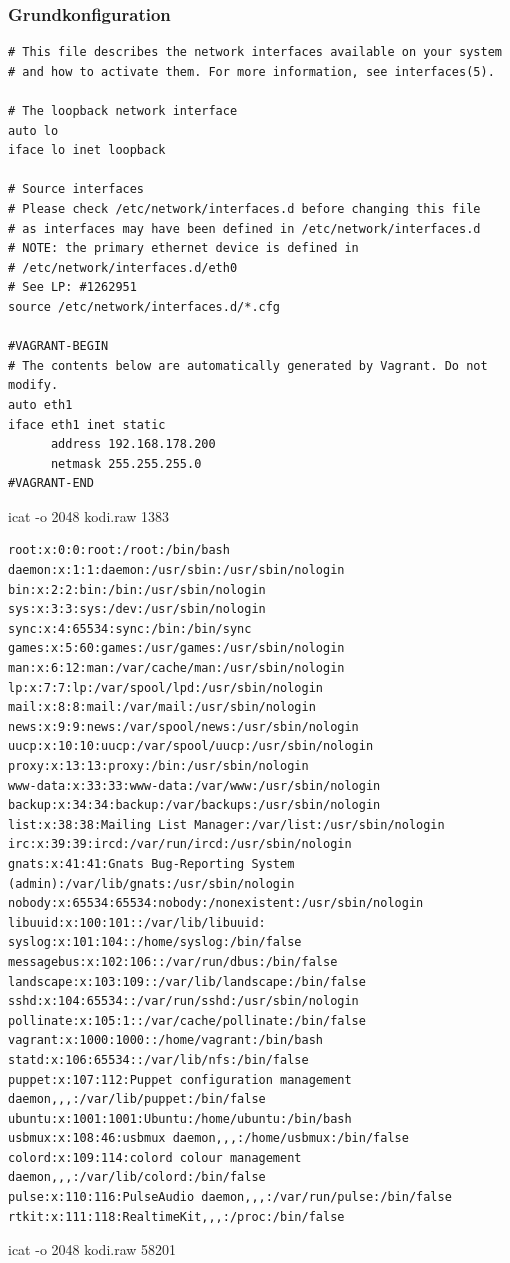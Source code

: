 \subsubsection{Grundkonfiguration}

\begin{cmd}[H]
\begin{verbatim}
# This file describes the network interfaces available on your system
# and how to activate them. For more information, see interfaces(5).

# The loopback network interface
auto lo
iface lo inet loopback

# Source interfaces
# Please check /etc/network/interfaces.d before changing this file
# as interfaces may have been defined in /etc/network/interfaces.d
# NOTE: the primary ethernet device is defined in
# /etc/network/interfaces.d/eth0
# See LP: #1262951
source /etc/network/interfaces.d/*.cfg

#VAGRANT-BEGIN
# The contents below are automatically generated by Vagrant. Do not modify.
auto eth1
iface eth1 inet static
      address 192.168.178.200
      netmask 255.255.255.0
#VAGRANT-END
\end{verbatim}
\caption{icat -o 2048 kodi.raw 1383}
\label{cmd:kodi-interfaces}
\end{cmd}

\begin{cmd}[H]
\begin{verbatim}
root:x:0:0:root:/root:/bin/bash
daemon:x:1:1:daemon:/usr/sbin:/usr/sbin/nologin
bin:x:2:2:bin:/bin:/usr/sbin/nologin
sys:x:3:3:sys:/dev:/usr/sbin/nologin
sync:x:4:65534:sync:/bin:/bin/sync
games:x:5:60:games:/usr/games:/usr/sbin/nologin
man:x:6:12:man:/var/cache/man:/usr/sbin/nologin
lp:x:7:7:lp:/var/spool/lpd:/usr/sbin/nologin
mail:x:8:8:mail:/var/mail:/usr/sbin/nologin
news:x:9:9:news:/var/spool/news:/usr/sbin/nologin
uucp:x:10:10:uucp:/var/spool/uucp:/usr/sbin/nologin
proxy:x:13:13:proxy:/bin:/usr/sbin/nologin
www-data:x:33:33:www-data:/var/www:/usr/sbin/nologin
backup:x:34:34:backup:/var/backups:/usr/sbin/nologin
list:x:38:38:Mailing List Manager:/var/list:/usr/sbin/nologin
irc:x:39:39:ircd:/var/run/ircd:/usr/sbin/nologin
gnats:x:41:41:Gnats Bug-Reporting System (admin):/var/lib/gnats:/usr/sbin/nologin
nobody:x:65534:65534:nobody:/nonexistent:/usr/sbin/nologin
libuuid:x:100:101::/var/lib/libuuid:
syslog:x:101:104::/home/syslog:/bin/false
messagebus:x:102:106::/var/run/dbus:/bin/false
landscape:x:103:109::/var/lib/landscape:/bin/false
sshd:x:104:65534::/var/run/sshd:/usr/sbin/nologin
pollinate:x:105:1::/var/cache/pollinate:/bin/false
vagrant:x:1000:1000::/home/vagrant:/bin/bash
statd:x:106:65534::/var/lib/nfs:/bin/false
puppet:x:107:112:Puppet configuration management daemon,,,:/var/lib/puppet:/bin/false
ubuntu:x:1001:1001:Ubuntu:/home/ubuntu:/bin/bash
usbmux:x:108:46:usbmux daemon,,,:/home/usbmux:/bin/false
colord:x:109:114:colord colour management daemon,,,:/var/lib/colord:/bin/false
pulse:x:110:116:PulseAudio daemon,,,:/var/run/pulse:/bin/false
rtkit:x:111:118:RealtimeKit,,,:/proc:/bin/false
\end{verbatim}
\caption{icat -o 2048 kodi.raw 58201}
\label{cmd:kodi-passwd}
\end{cmd}

